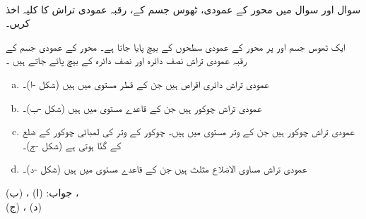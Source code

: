 \\
سوال  اور سوال  میں  محور کے عمودی، ٹھوس جسم کے، رقبہ عمودی تراش  کا کلیہ اخذ کریں۔ 

ایک ٹھوس جسم   اور  پر  محور  کے عمودی سطحوں کے بیچ پایا جاتا ہے۔   محور کے عمودی جسم  کے رقبہ عمودی تراش نصف دائرہ  اور نصف دائرہ  کے بیچ پائے جاتے ہیں ۔ 
\begin{enumerate}[a.]
\item
عمودی تراش دائری اقراص ہیں جن کے قطر  مستوی میں ہیں (شکل -ا)۔
\item
عمودی تراش چوکور ہیں جن کے قاعدے  مستوی میں ہیں (شکل -ب)۔
\item
عمودی تراش چوکور ہیں جن کے وتر  مستوی میں ہیں۔ چوکور کے وتر کی لمبائی چوکور کے ضلع کے  گنّا ہوتی ہے (شکل -ج)۔
\item
عمودی تراش مساوی الاضلاع مثلث ہیں جن کے قاعدے  مستوی میں ہیں (شکل -د)۔
\end{enumerate}
جواب:\quad
(ا) ، (ب) ،\\ (ج) ، (د) 
